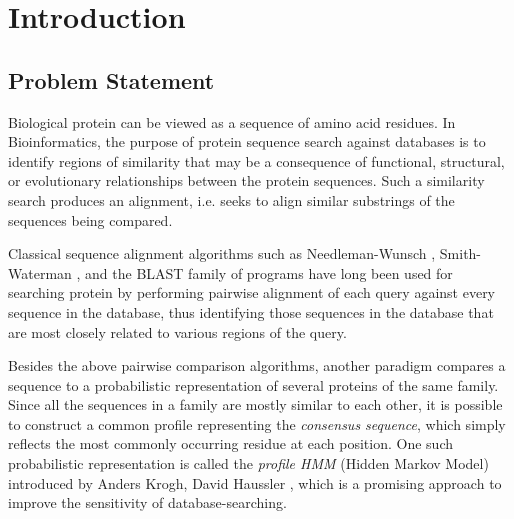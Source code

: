 
\chapter{Introduction} %



\section{Problem Statement}

Biological protein can be viewed as a sequence of amino acid residues. In Bioinformatics, the purpose of protein sequence search against databases is to identify regions of similarity that may be a consequence of functional, structural, or evolutionary relationships between the protein sequences.
Such a similarity search produces an alignment, i.e. seeks to align similar substrings of the sequences being compared.

Classical sequence alignment algorithms such as Needleman-Wunsch \citep{Needleman}, Smith-Waterman \citep{SW}, and the BLAST family of programs \citep{Altschul} have long been used for searching protein by performing pairwise alignment of each query against every sequence in the database, thus identifying those sequences in the database that are most closely related to various regions of the query.

Besides the above pairwise comparison algorithms, another paradigm compares a sequence to a probabilistic representation of several
proteins of the same family. Since all the sequences in a family are mostly similar to each other, it is possible to construct a common profile representing the \emph{consensus sequence}, which simply reflects the most commonly occurring residue at each position. One such probabilistic representation is called the \emph{profile HMM} (Hidden Markov Model) introduced by Anders Krogh, David Haussler \citep{Krogh}, which is a promising approach to improve the sensitivity of database-searching.


